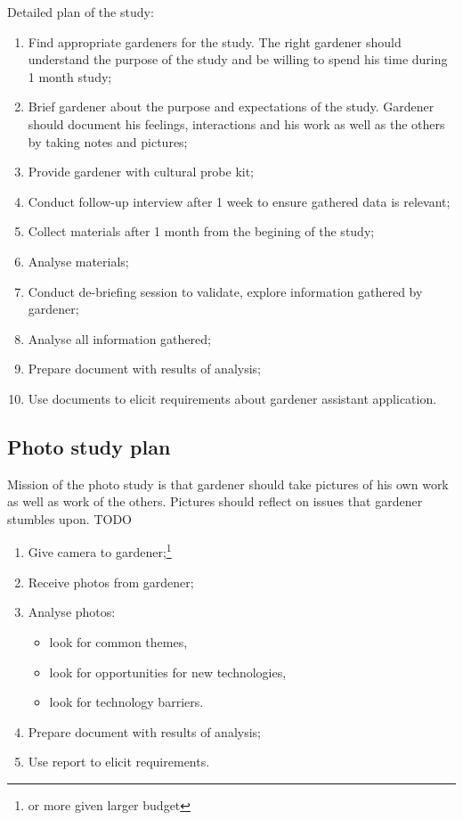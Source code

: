 \documentclass[12pt, a4paper]{article}
\begin{document}
Detailed plan of the study:
\begin{enumerate}
\item Find appropriate gardeners for the study. The right gardener should understand the purpose of the study and be willing to spend his time during 1 month study;
\item Brief gardener about the purpose and expectations of the study. Gardener should document his feelings, interactions and his work as well as the others by taking notes and pictures;
\item Provide gardener with cultural probe kit;
\item Conduct follow-up interview after 1 week to ensure gathered data is relevant;
\item Collect materials after 1 month from the begining of the study;
\item Analyse materials;
\item Conduct de-briefing session to validate, explore information gathered by gardener;
\item Analyse all information gathered;
\item Prepare document with results of analysis;
\item Use documents to elicit requirements about gardener assistant application.
\end{enumerate}

\subsection{Photo study plan}
Mission of the photo study is that gardener should take pictures of his own work as well as work of the others. Pictures should reflect on issues that gardener stumbles upon. TODO
\begin{enumerate}
\item Give camera to gardener;\footnote{or more given larger budget}
\item Receive photos from gardener;
\item Analyse photos:
  \begin{itemize}
    \item look for common themes,
    \item look for opportunities for new technologies,
    \item look for technology barriers.
  \end{itemize} 
 \item Prepare document with results of analysis;
 \item Use report to elicit requirements.
\end{enumerate}
\end{document}
